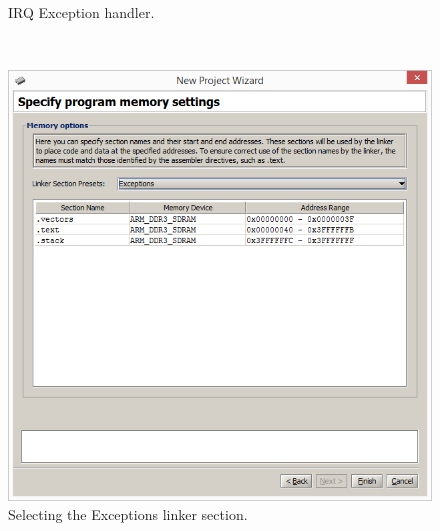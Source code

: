 \documentclass[epsfig,10pt,fullpage]{article}
\newcommand{\CommonDocsPath}{../../../../common/docs}
\begin{document}
\begin{figure}[H]
\begin{center}

\end{center}
\caption{IRQ Exception handler.}
\label{fig:irq_code}
\end{figure}

~\\
\begin{figure}[htb]
	\begin{center}
	\includegraphics[scale=0.58]{figures/exceptions_C.png}
	\end{center}
	\vspace{-0.25cm}\caption{Selecting the {\sf Exceptions} linker section.}
\label{fig:exceptions}
\end{figure}



\end{document}
